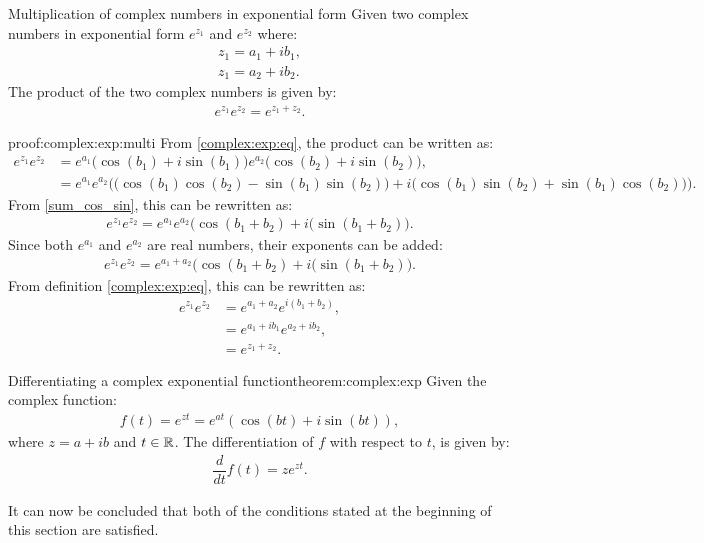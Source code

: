 \begin{theorem}{Multiplication of complex numbers in exponential form}{}
Given two complex numbers in exponential form $e^{z_1}$ and $e^{z_2}$ where:
\begin{align*}
z_1=a_1+ib_1,
\\
z_1=a_2+ib_2.
\end{align*}
The product of the two complex numbers is given by:
\begin{align*}
e^{z_1}e^{z_2}=e^{z_1+z_2}.
\end{align*}
\end{theorem}


\begin{prof}{}{proof:complex:exp:multi}
From \cref{complex:exp:eq}, the product can be written as:
\begin{align*}
e^{z_1}e^{z_2}&=e^{a_1}\big(\cos(b_1)+i\sin(b_1)\big)e^{a_2}\big(\cos(b_2)+i\sin(b_2)\big),
\\
&=e^{a_1}e^{a_2} \Big( \big(\cos(b_1)\cos(b_2)-\sin(b_1) \sin(b_2) \big)+i \big(\cos(b_1)\sin(b_2)+\sin(b_1)\cos(b_2) \big) \Big).
\end{align*}
From \eqref{sum_cos_sin}, this can be rewritten as:
\begin{align*}
e^{z_1}e^{z_2}=e^{a_1}e^{a_2}\big(\cos(b_1+b_2)+i(\sin(b_1+b_2)\big).
\end{align*}
Since both $e^{a_1}$ and $e^{a_2}$ are real numbers, their exponents can be added:
\begin{align*}
e^{z_1}e^{z_2}=e^{a_1+a_2}\big(\cos(b_1+b_2)+i(\sin(b_1+b_2)\big).
\end{align*}
From definition \cref{complex:exp:eq},
this can be rewritten as:
\begin{align*}
e^{z_1}e^{z_2}&=e^{a_1+a_2}e^{i(b_1+b_2)},
\\
&=e^{a_1+ib_1}e^{a_2+ib_2},
\\
&=e^{z_1+z_2}.
\end{align*} 
\end{prof}

\begin{theorem}{Differentiating a complex exponential function}{theorem:complex:exp}
Given the complex function:
\begin{align*}
f(t)=e^{zt}=e^{at}(\cos(bt)+i\sin(bt)),
\end{align*}
where $z=a+ib$ and $t\in \mathbb{R}$. The differentiation of $f$ with respect to $t$, is given by:
\begin{align*}
\dfrac{d}{dt}f(t)=ze^{zt}.
\end{align*}
\end{theorem}



\noindent
It can now be concluded that both of the conditions stated at the beginning of this section are satisfied. 